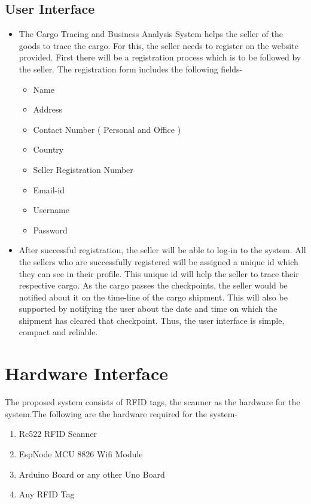 \documentclass{scrreprt}
\begin{document}
\subsection{User Interface}
 \begin{itemize}
 \item The Cargo Tracing and Business Analysis System helps the seller of the goods to trace the cargo. For this, the seller needs to register on the website provided. First there will be a registration process which is to be followed by the seller. The registration form includes the following fields-
 
 \begin{itemize} 
   \item Name
   \item Address
   \item Contact Number ( Personal and Office )
   \item Country
   \item Seller Registration Number
   \item Email-id
   \item Username
   \item Password
   
   \end{itemize}
   

 \item After successful registration, the seller will be able to log-in to the system. All the sellers who are successfully registered will be assigned a unique id which they can see in their profile. This unique id will help the seller to trace their respective cargo. As the cargo passes the checkpoints, the seller would be notified about it on the time-line of the cargo shipment. This will also be supported by notifying the user about the date and time on which the shipment has cleared that checkpoint. Thus, the user interface is simple, compact and reliable. 
 
 
  \end{itemize}
  
\section{Hardware Interface}
The proposed system  consists of RFID tags, the scanner as the hardware for the system.The following are the hardware required for the system-
 \begin{enumerate}
    
 
     \item Rc522 RFID Scanner
     \item EspNode MCU 8826 Wifi Module
     \item Arduino Board or any other Uno Board
     \item Any RFID Tag
     
 \end{enumerate}
 
\end{document}
